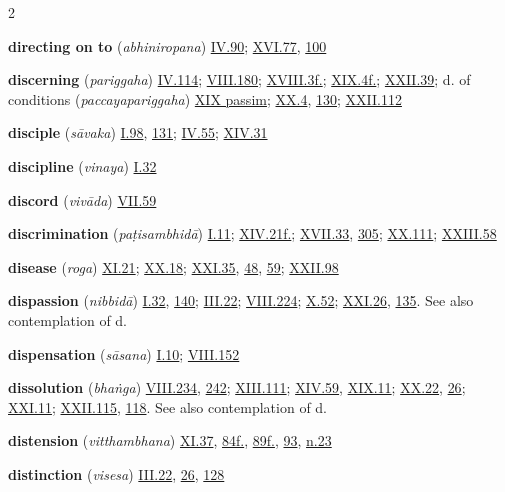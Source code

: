 \begin{multicols}{2}
\begin{vismHanging}
\par\textbf{directing on to} (\emph{abhiniropana}) \hyperlink{IV.90}{IV.90}{}; \hyperlink{XVI.77}{XVI.77}{}, \hyperlink{XVI.100}{100}{}
\par\textbf{discerning} (\emph{pariggaha}) \hyperlink{IV.114}{IV.114}{}; \hyperlink{VIII.180}{VIII.180}{}; \hyperlink{XVIII.3}{XVIII.3f.}{}; \hyperlink{XIX.4}{XIX.4f.}{}; \hyperlink{XXII.39}{XXII.39}{}; d. of conditions (\emph{paccayapariggaha}) \hyperlink{XIX}{XIX passim}{}; \hyperlink{XX.4}{XX.4}{}, \hyperlink{XX.130}{130}{}; \hyperlink{XXII.112}{XXII.112}{}
\par\textbf{disciple} (\emph{sāvaka}) \hyperlink{I.98}{I.98}{}, \hyperlink{I.131}{131}{}; \hyperlink{IV.55}{IV.55}{}; \hyperlink{XIV.31}{XIV.31}{}
\par\textbf{discipline} (\emph{vinaya}) \hyperlink{I.32}{I.32}{}
\par\textbf{discord} (\emph{vivāda}) \hyperlink{VII.59}{VII.59}{}
\par\textbf{discrimination} (\emph{paṭisambhidā}) \hyperlink{I.11}{I.11}{}; \hyperlink{XIV.21}{XIV.21f.}{}; \hyperlink{XVII.33}{XVII.33}{}, \hyperlink{XVII.305}{305}{}; \hyperlink{XX.111}{XX.111}{}; \hyperlink{XXIII.58}{XXIII.58}{}
\par\textbf{disease} (\emph{roga}) \hyperlink{XI.21}{XI.21}{}; \hyperlink{XX.18}{XX.18}{}; \hyperlink{XXI.35}{XXI.35}{}, \hyperlink{XXI.48}{48}{}, \hyperlink{XXI.59}{59}{}; \hyperlink{XXII.98}{XXII.98}{}
\par\textbf{dispassion} (\emph{nibbidā}) \hyperlink{I.32}{I.32}{}, \hyperlink{I.140}{140}{}; \hyperlink{III.22}{III.22}{}; \hyperlink{VIII.224}{VIII.224}{}; \hyperlink{X.52}{X.52}{}; \hyperlink{XXI.26}{XXI.26}{}, \hyperlink{XXI.135}{135}{}. See also contemplation of d. 
\par\textbf{dispensation} (\emph{sāsana}) \hyperlink{I.10}{I.10}{}; \hyperlink{VIII.152}{VIII.152}{}
\par\textbf{dissolution} (\emph{bhaṅga}) \hyperlink{VIII.234}{VIII.234}{}, \hyperlink{VIII.242}{242}{}; \hyperlink{XIII.111}{XIII.111}{}; \hyperlink{XIV.59}{XIV.59}{}, \hyperlink{XIX.11}{XIX.11}{}; \hyperlink{XX.22}{XX.22}{}, \hyperlink{XX.26}{26}{}; \hyperlink{XXI.11}{XXI.11}{}; \hyperlink{XXII.115}{XXII.115}{}, \hyperlink{XXII.118}{118}{}. See also contemplation of d. 
\par\textbf{distension} (\emph{vitthambhana}) \hyperlink{XI.37}{XI.37}{}, \hyperlink{XI.84}{84f.}{}, \hyperlink{XI.89}{89f.}{}, \hyperlink{XI.93}{93}{}, \hyperlink{XI.n23}{n.23}{}
\par\textbf{distinction} (\emph{visesa}) \hyperlink{III.22}{III.22}{}, \hyperlink{III.26}{26}{}, \hyperlink{III.128}{128}{}

\end{vismHanging}
\end{multicols}
